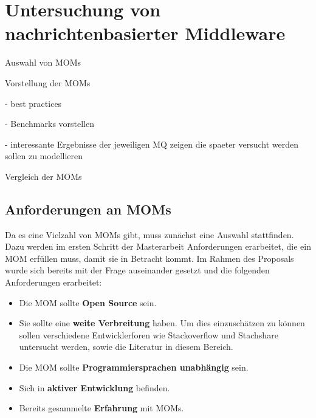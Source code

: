 

\chapter{Untersuchung von nachrichtenbasierter Middleware}

Auswahl von MOMs

Vorstellung der MOMs

- best practices

- Benchmarks vorstellen

- interessante Ergebnisse der jeweiligen MQ zeigen die spaeter versucht werden sollen zu modellieren

Vergleich der MOMs

\label{ch:momsysteme}
\section{Anforderungen an MOMs}
Da es eine Vielzahl von MOMs gibt, muss zunächst eine Auswahl stattfinden. Dazu werden im ersten Schritt der Masterarbeit Anforderungen erarbeitet, die ein MOM erfüllen muss, damit sie in Betracht kommt. Im Rahmen des Proposals wurde sich bereits mit der Frage auseinander gesetzt und die folgenden Anforderungen erarbeitet:
\begin{itemize}
\item Die MOM sollte \textbf{Open Source} sein.
\item Sie sollte eine \textbf{weite Verbreitung} haben. Um dies einzuschätzen zu können sollen verschiedene Entwicklerforen wie Stackoverflow und Stachshare untersucht werden, sowie die Literatur in diesem Bereich.
\item %
Die MOM sollte \textbf{Programmiersprachen unabhängig} sein.
\item Sich in \textbf{aktiver Entwicklung} befinden.
\item Bereits gesammelte \textbf{Erfahrung} mit MOMs.
\end{itemize}


